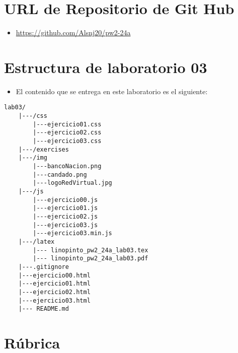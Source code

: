 \documentclass{article}
\newcommand{\itemPracticeNumber}{03}
\begin{document}
\section{URL de Repositorio de Git Hub}
\begin{itemize}
	\item \url{https://github.com/Alsnj20/pw2-24a}
\end{itemize}

\section{Estructura de laboratorio \itemPracticeNumber}
\begin{itemize}
	\item El contenido que se entrega en este laboratorio es el siguiente:
\end{itemize}
\begin{lstlisting}[style=ascii-tree]
lab03/
    |---/css
        |---ejercicio01.css
        |---ejercicio02.css
        |---ejercicio03.css
    |---/exercises
    |---/img
        |---bancoNacion.png
        |---candado.png
        |---logoRedVirtual.jpg
    |---/js
        |---ejercicio00.js
        |---ejercicio01.js
        |---ejercicio02.js
        |---ejercicio03.js
        |---ejercicio03.min.js
    |---/latex
        |--- linopinto_pw2_24a_lab03.tex
        |--- linopinto_pw2_24a_lab03.pdf
    |---.gitignore
    |---ejercicio00.html
    |---ejercicio01.html
    |---ejercicio02.html
    |---ejercicio03.html
    |--- README.md
\end{lstlisting}
\section{Rúbrica}
\end{document}
